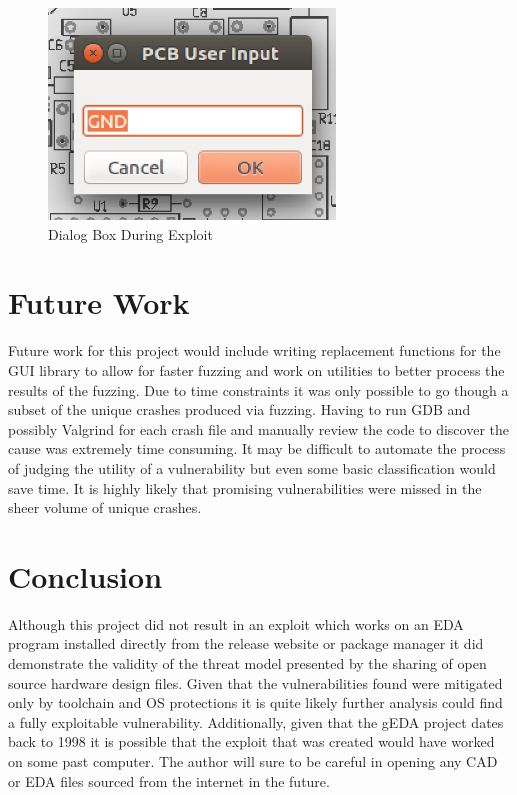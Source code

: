 \documentclass[12pt]{article}
\begin{document}
\begin{figure}[H]
\centering
\includegraphics[width=3in]{images/exploit-gui-cropped.png}
\caption{Dialog Box During Exploit}
\label{fig:exploit-gui}
\end{figure}

\section{Future Work}
\label{S:6}
Future work for this project would include writing replacement functions for the GUI library to allow for faster fuzzing and work on utilities to better process the results of the fuzzing. Due to time constraints it was only possible to go though a subset of the unique crashes produced via fuzzing. Having to run GDB and possibly Valgrind for each crash file and manually review the code to discover the cause was extremely time consuming. It may be difficult to automate the process of judging the utility of a vulnerability but even some basic classification would save time. It is highly likely that promising vulnerabilities were missed in the sheer volume of unique crashes. 

\section{Conclusion}
\label{S:7}
Although this project did not result in an exploit which works on an EDA program installed directly from the release website or package manager it did demonstrate the validity of the threat model presented by the sharing of open source hardware design files. Given that the vulnerabilities found were mitigated only by toolchain and OS protections it is quite likely further analysis could find a fully exploitable vulnerability. Additionally, given that the gEDA project dates back to 1998 it is possible that the exploit that was created would have worked on some past computer. The author will sure to be careful in opening any CAD or EDA files sourced from the internet in the future. 
\end{document}
